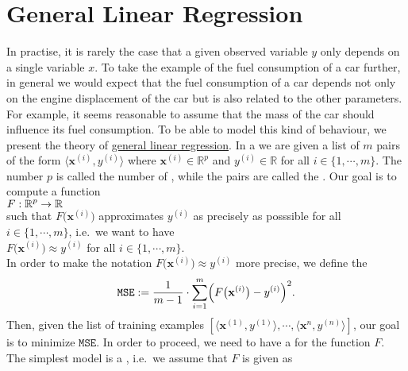\section{General Linear Regression}
In practise, it is rarely the case that a given observed variable $y$ only depends on a single variable $x$.
To take the example of the fuel consumption of a car further, in general we would expect that the fuel consumption
of a car depends not only on the engine displacement of the car but is also related to the other parameters.
For example, it seems reasonable to assume that the mass of the car should influence its fuel consumption.
To be able to model this kind of behaviour,  we present the theory of   
\href{https://en.wikipedia.org/wiki/Linear_regression}{general linear regression}.
In a  we are given a list of $m$ pairs of the form $\langle\mathbf{x}^{(i)}, y^{(i)} \rangle$ 
where $\mathbf{x}^{(i)} \in \mathbb{R}^p$ and $y^{(i)} \in \mathbb{R}$ for all $i \in \{1,\cdots,m\}$.  The
number $p$ is called the number of , while the pairs are called the . 
Our goal is to compute a function 
\\[0.2cm]
\hspace*{1.3cm}
$\displaystyle F:\mathbb{R}^p \rightarrow \mathbb{R}$
\\[0.2cm]  
such that $F\bigl(\mathbf{x}^{(i)}\bigr)$ approximates  $y^{(i)}$ as precisely as posssible
for all $i\in\{1,\cdots,m\}$, i.e.~we want to have
\\[0.2cm]
\hspace*{1.3cm}
$F\bigl(\mathbf{x}^{(i)}\bigr) \approx y^{(i)}$ \quad for all $i\in\{1,\cdots,m\}$.
\\[0.2cm]
In order to make the notation $F\bigl(\mathbf{x}^{(i)}\bigr) \approx y^{(i)}$ more precise, we
define the   
\begin{equation}
  \label{eq:squared-error-1}
  \mathtt{MSE} := \frac{1}{m-1} \cdot \sum\limits_{i=1}^{m} \Bigl(F\bigl(\mathbf{x}^{(i)}\bigr) - y^{(i)}\Bigr)^2. 
\end{equation}
Then, given the list of training examples $[\langle \mathbf{x}^{(1)}, y^{(1)} \rangle, \cdots, \langle
\mathbf{x}^{n}, y^{(n)} \rangle]$, our goal is to minimize $\mathtt{MSE}$.  
In order to proceed, we need to have a  for the function $F$.  The simplest model is a 
,  i.e.~we assume that $F$ is given as 
